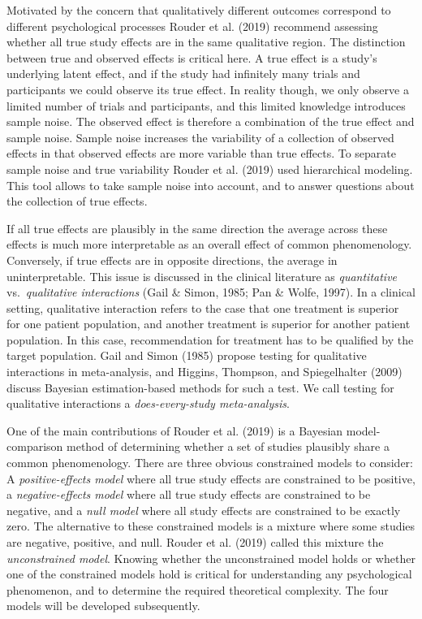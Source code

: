 \documentclass[english,,man]{apa6}
\begin{document}
Motivated by the concern that qualitatively different outcomes correspond to different psychological processes Rouder et al. (2019) recommend assessing whether all true study effects are in the same qualitative region. The distinction between true and observed effects is critical here. A true effect is a study's underlying latent effect, and if the study had infinitely many trials and participants we could observe its true effect. In reality though, we only observe a limited number of trials and participants, and this limited knowledge introduces sample noise. The observed effect is therefore a combination of the true effect and sample noise. Sample noise increases the variability of a collection of observed effects in that observed effects are more variable than true effects. To separate sample noise and true variability Rouder et al. (2019) used hierarchical modeling. This tool allows to take sample noise into account, and to answer questions about the collection of true effects.

If all true effects are plausibly in the same direction the average across these effects is much more interpretable as an overall effect of common phenomenology. Conversely, if true effects are in opposite directions, the average in uninterpretable. This issue is discussed in the clinical literature as \emph{quantitative} vs.~\emph{qualitative interactions} (Gail \& Simon, 1985; Pan \& Wolfe, 1997). In a clinical setting, qualitative interaction refers to the case that one treatment is superior for one patient population, and another treatment is superior for another patient population. In this case, recommendation for treatment has to be qualified by the target population. Gail and Simon (1985) propose testing for qualitative interactions in meta-analysis, and Higgins, Thompson, and Spiegelhalter (2009) discuss Bayesian estimation-based methods for such a test. We call testing for qualitative interactions a \emph{does-every-study meta-analysis}.

One of the main contributions of Rouder et al. (2019) is a Bayesian model-comparison method of determining whether a set of studies plausibly share a common phenomenology. There are three obvious constrained models to consider: A \emph{positive-effects model} where all true study effects are constrained to be positive, a \emph{negative-effects model} where all true study effects are constrained to be negative, and a \emph{null model} where all study effects are constrained to be exactly zero. The alternative to these constrained models is a mixture where some studies are negative, positive, and null. Rouder et al. (2019) called this mixture the \emph{unconstrained model}. Knowing whether the unconstrained model holds or whether one of the constrained models hold is critical for understanding any psychological phenomenon, and to determine the required theoretical complexity. The four models will be developed subsequently.
\end{document}
